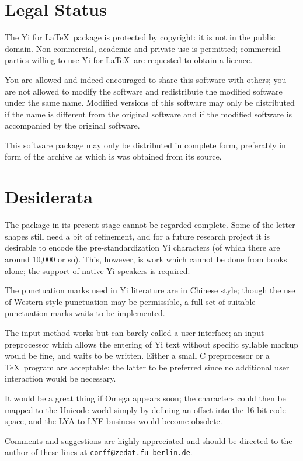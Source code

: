 \documentclass[11pt,a4paper]{article}
\newcommand{\YiL}{\textsf{Yi for \LaTeX}}
\begin{document}
\section{Legal Status}

The \YiL\ package is protected by copyright: it is not in the public
domain. Non-commercial, academic and private use is permitted;
commercial parties willing to use \YiL\ are requested to obtain a licence.

You are allowed and indeed encouraged to share this software with
others; you are not allowed to modify the software and redistribute
the modified software under the same name. Modified versions of this
software may only be distributed if the name is different from the
original software and if the modified software is accompanied by
the original software.

This software package may only be distributed in complete form,
preferably in form of the archive as which is was obtained from
its source.

\section{Desiderata}
The package in its present stage cannot be regarded complete.
Some of the letter shapes still need a bit of refinement, and for
a future research project it is desirable to encode the
pre-standardization Yi characters (of which there are around 10,000
or so). This, however, is work which cannot be done from books alone;
the support of native Yi speakers is required.

The punctuation marks used in Yi literature are in Chinese style;
though the use of Western style punctuation may be permissible, a
full set of suitable punctuation marks waits to be implemented.

The input method works but can barely called a user interface; an
input preprocessor which allows the entering of Yi text without specific
syllable markup would be fine, and waits to be written. Either a
small C preprocessor or a \TeX\ program are acceptable; the latter
to be preferred since no additional user interaction would be necessary.

It would be a great thing if Omega appears soon; the characters could
then be mapped to the Unicode world simply by defining an offset into
the 16-bit code space, and the LYA to LYE business would become obsolete.

Comments and suggestions are highly appreciated and should be
directed to the author of these lines at \verb"corff@zedat.fu-berlin.de".
\end{document}

